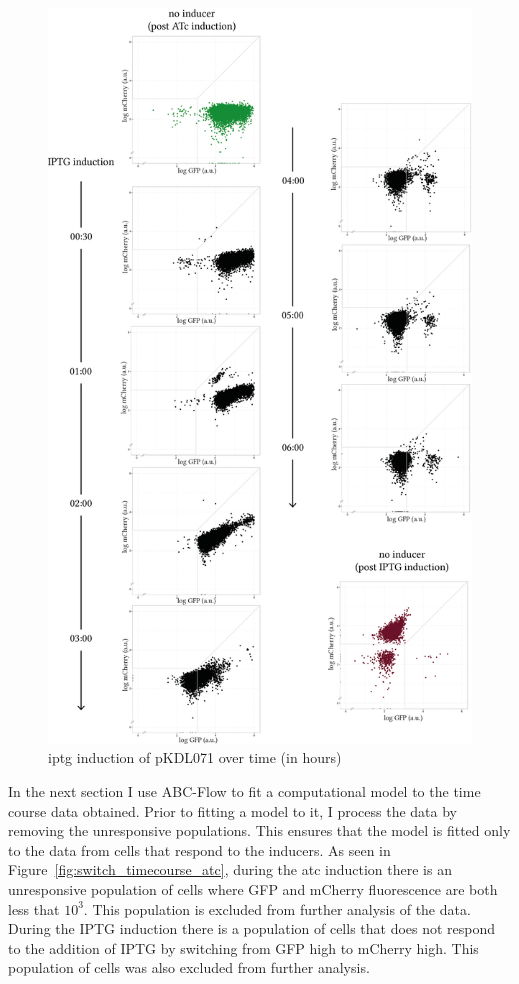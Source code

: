\begin{figure}[tb]
	\begin{center}
\includegraphics[scale=0.7]{../../chapters/chapterABCFlow/images/pKDL071_iptg_time.png}
\caption[\acrshort{iptg} induction of pKDL071 over time]{\label{fig:switch_timecourse_iptg} \acrshort{iptg} induction of pKDL071 over time (in  hours)}
\end{center}
\end{figure}
\clearpage

In the next section I use ABC-Flow to fit a computational model to the time course data obtained. Prior to fitting a model to it, I process the data by removing the unresponsive populations. This ensures that the model is fitted only to the data from cells that respond to the inducers. As seen in Figure~\ref{fig:switch_timecourse_atc}, during the \acrshort{atc} induction there is an unresponsive population of cells where GFP and mCherry fluorescence are both less that $10^3$. This population is excluded from further analysis of the data. During the IPTG induction there is a population of cells that does not respond to the addition of IPTG by switching from GFP high to mCherry high. This population of cells was also excluded from further analysis. 


